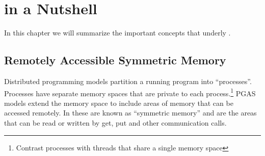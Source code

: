%
% 
% 
% 
% 
% 
% 
%


\chapter{\openshmem in a Nutshell}


In this chapter we will summarize the important concepts that underly
\openshmem.

\section{Remotely Accessible Symmetric Memory}

Distributed programming models partition a running program into
``processes''.  Processes have separate memory spaces that are private
to each process.\footnote{Contrast processes with threads that share a
  single memory space} PGAS models extend the memory space to include
areas of memory that can be accessed remotely.  In \openshmem these
are known as ``symmetric memory'' and are the areas that can be read
or written by get, put and other communication calls.

